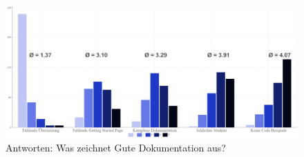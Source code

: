 \begin{figure}[h]
    \centering
    \includegraphics[scale=0.05]{figures/05/SchlechteDoku_BarChart.png}
    \caption{Antworten: Was zeichnet Gute Dokumentation aus?}
    \label{abb:SchlechteDoku_BarChart}
\end{figure}


